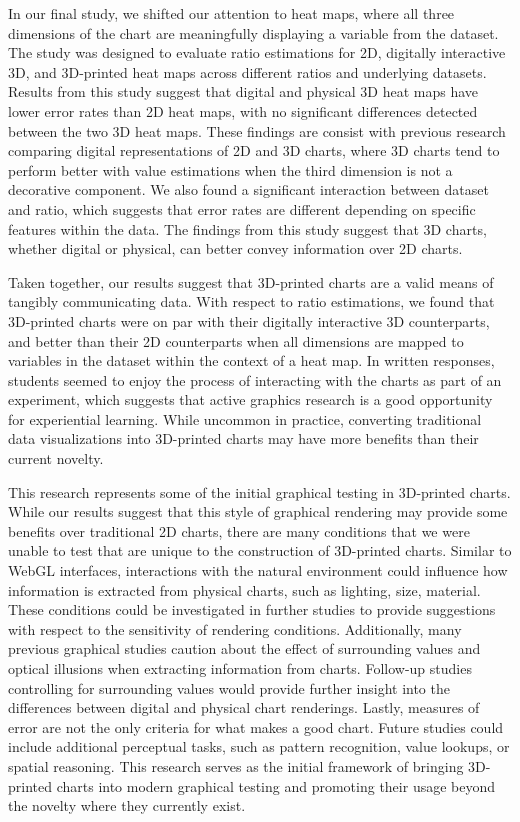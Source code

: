 \documentclass[phd]{nuthesis}
\begin{document}
In our final study, we shifted our attention to heat maps, where all
three dimensions of the chart are meaningfully displaying a variable
from the dataset. The study was designed to evaluate ratio estimations
for 2D, digitally interactive 3D, and 3D-printed heat maps across
different ratios and underlying datasets. Results from this study
suggest that digital and physical 3D heat maps have lower error rates
than 2D heat maps, with no significant differences detected between the
two 3D heat maps. These findings are consist with previous research
comparing digital representations of 2D and 3D charts, where 3D charts
tend to perform better with value estimations when the third dimension
is not a decorative component. We also found a significant interaction
between dataset and ratio, which suggests that error rates are different
depending on specific features within the data. The findings from this
study suggest that 3D charts, whether digital or physical, can better
convey information over 2D charts.

Taken together, our results suggest that 3D-printed charts are a valid
means of tangibly communicating data. With respect to ratio estimations,
we found that 3D-printed charts were on par with their digitally
interactive 3D counterparts, and better than their 2D counterparts when
all dimensions are mapped to variables in the dataset within the context
of a heat map. In written responses, students seemed to enjoy the
process of interacting with the charts as part of an experiment, which
suggests that active graphics research is a good opportunity for
experiential learning. While uncommon in practice, converting
traditional data visualizations into 3D-printed charts may have more
benefits than their current novelty.

This research represents some of the initial graphical testing in
3D-printed charts. While our results suggest that this style of
graphical rendering may provide some benefits over traditional 2D
charts, there are many conditions that we were unable to test that are
unique to the construction of 3D-printed charts. Similar to WebGL
interfaces, interactions with the natural environment could influence
how information is extracted from physical charts, such as lighting,
size, material. These conditions could be investigated in further
studies to provide suggestions with respect to the sensitivity of
rendering conditions. Additionally, many previous graphical studies
caution about the effect of surrounding values and optical illusions
when extracting information from charts. Follow-up studies controlling
for surrounding values would provide further insight into the
differences between digital and physical chart renderings. Lastly,
measures of error are not the only criteria for what makes a good chart.
Future studies could include additional perceptual tasks, such as
pattern recognition, value lookups, or spatial reasoning. This research
serves as the initial framework of bringing 3D-printed charts into
modern graphical testing and promoting their usage beyond the novelty
where they currently exist.
\end{document}
